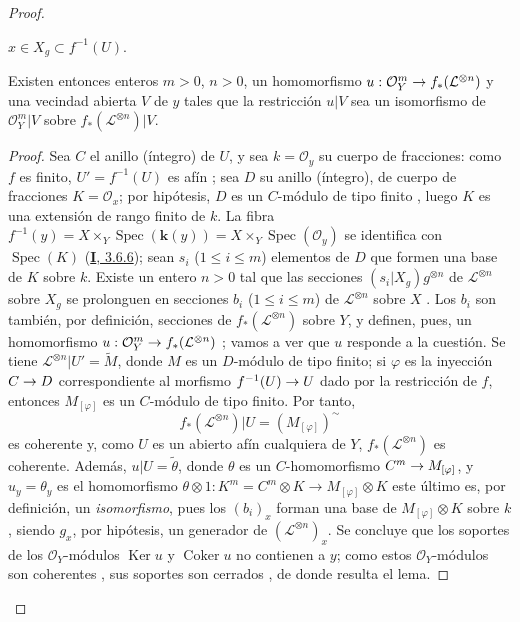 \documentclass[oneside,10pt]{amsart}
\makeatletter
\renewcommand{\leq}{\leqslant}
\newcommand{\ega@arrow}[2]{\mathchoice{#1}{#2}{#2}{#2}}
\renewcommand{\to}{\ega@arrow{\longrightarrow}{\rightarrow}}
\makeatother
\begin{document}
\begin{proof}
\begin{lemma}[6.7.1.1]
$x\in X_g\subset f^{-1}(U)$.

Existen entonces enteros $m>0$, $n>0$, un homomorfismo
$u:\mathcal{O}_Y^m\to f_*(\mathcal{L}^{\otimes n})$
y una vecindad abierta $V$ de $y$ tales que la restricción $u|V$ sea un isomorfismo de $\mathcal{O}_Y^m|V$ sobre $f_*(\mathcal{L}^{\otimes n})|V$.
\end{lemma}

\begin{proof}
Sea $C$ el anillo (íntegro) de $U$, y sea $k=\mathcal{O}_y$ su cuerpo de fracciones:
como $f$ es finito, $U'=f^{-1}(U)$ es afín ;
sea $D$ su anillo (íntegro), de cuerpo de fracciones $K=\mathcal{O}_x$;
por hipótesis, $D$ es un $C$-módulo de tipo finito , luego $K$ es una extensión de rango finito de $k$.
La fibra
$f^{-1}(y)=X\times_Y\operatorname{Spec}(\boldsymbol{k}(y))=X\times_Y\operatorname{Spec}(\mathcal{O}_y)$
se identifica con $\operatorname{Spec}(K)$ (\hyperref[I.3.6.5-fr]{\textbf{I}, 3.6.6});
sean $s_i$ ($1\leq i\leq m$) elementos de $D$ que formen una base de $K$ sobre $k$.
Existe un entero $n>0$ tal que las secciones
$(s_i|X_g)g^{\otimes n}$
de $\mathcal{L}^{\otimes n}$ sobre $X_g$ se prolonguen en secciones $b_i$ ($1\leq i\leq m$) de $\mathcal{L}^{\otimes n}$ sobre $X$ .
Los $b_i$ son también, por definición, secciones de $f_*(\mathcal{L}^{\otimes n})$ sobre $Y$, y definen, pues, un homomorfismo
$u:\mathcal{O}_Y^m\to f_*(\mathcal{L}^{\otimes n})$
;
vamos a ver que $u$ responde a la cuestión.
Se tiene
$\mathcal{L}^{\otimes n}|U'=\widetilde{M}$,
donde $M$ es un $D$-módulo de tipo finito;
si $\varphi$ es la inyección $C\to D$ correspondiente al morfismo $f^{-1}(U)\to U$ dado por la restricción de $f$, entonces $M_{[\varphi]}$ es un $C$-módulo de tipo finito.
Por tanto,
\[
f_*(\mathcal{L}^{\otimes n})|U=(M_{[\varphi]})^\sim
\]
 es coherente y, como $U$ es un abierto afín cualquiera de $Y$, $f_*(\mathcal{L}^{\otimes n})$ es coherente.
Además, $u|U=\widetilde{\theta}$, donde $\theta$ es un $C$-homomorfismo
$C^m\to M_{[\varphi]}$,
y $u_y=\theta_y$ es el homomorfismo
$\theta\otimes1:K^m=C^m\otimes K\longrightarrow M_{[\varphi]}\otimes K$
este último es, por definición, un \emph{isomorfismo}, pues los $(b_i)_x$ forman una base de $M_{[\varphi]}\otimes K$ sobre $k$, siendo $g_x$, por hipótesis, un generador de $(\mathcal{L}^{\otimes n})_x$.
Se concluye que los soportes de los $\mathcal{O}_Y$-módulos $\operatorname{Ker}u$ y $\operatorname{Coker}u$ no contienen a $y$;
como estos $\mathcal{O}_Y$-módulos son coherentes , sus soportes son cerrados , de donde resulta el lema.
\end{proof}


\end{proof}
\end{document}
